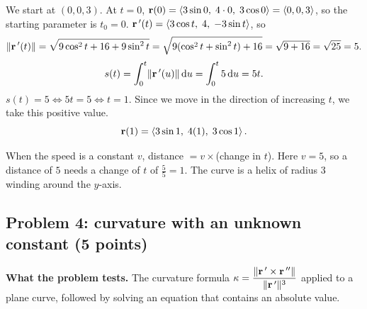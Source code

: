  We start at $(0,0,3)$. At $t=0$,
$\mathbf{r}(0)=\left\langle 3\sin0,\;4\cdot0,\;3\cos0 \right\rangle=\left\langle 0,0,3 \right\rangle$, so the starting parameter is $t_0=0$.
 $\mathbf{r}\,'(t)=\left\langle 3\cos t,\;4,\;-3\sin t \right\rangle$, so
\[
  \lVert\mathbf{r}\,'(t)\rVert=\sqrt{9\cos^2t+16+9\sin^2t}=\sqrt{9(\cos^2t+\sin^2t)+16}=\sqrt{9+16}=\sqrt{25}=5 .
\]
\[
  s(t)=\int_0^t\lVert\mathbf{r}\,'(u)\rVert\,\mathrm{d} u=\int_0^t5\,\mathrm{d} u=5t .
\]
 $s(t)=5\iff5t=5\iff t=1$. Since we
move in the direction of increasing $t$, we take this positive value.
\[
  \mathbf{r}(1)=\left\langle 3\sin1,\;4(1),\;3\cos1 \right\rangle.
\]

\begin{altmethod}
When the speed is a constant $v$, distance $=v\times$(change in $t$). Here
$v=5$, so a distance of $5$ needs a change of $t$ of $\frac55=1$. The curve is a
helix of radius $3$ winding around the $y$-axis.
\end{altmethod}



\subsection{Problem 4: curvature with an unknown constant (5 points)}

\textbf{What the problem tests.} The curvature formula
$\kappa=\dfrac{\lVert\mathbf{r}\,'\times\mathbf{r}\,''\rVert}{\lVert\mathbf{r}\,'\rVert^3}$ applied to a plane curve, followed
by solving an equation that contains an absolute value.

